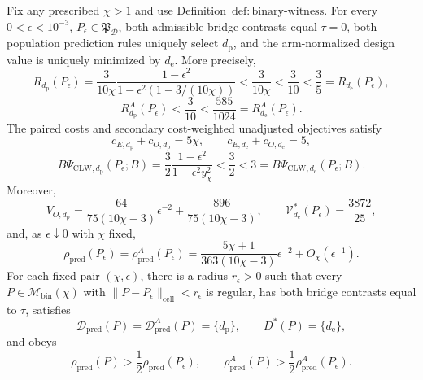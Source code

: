 Fix any prescribed \(\chi>1\) and use Definition~\(\mathrm{def{:}binary\text{-}witness}\).  For every \(0<\epsilon<10^{-3}\), \(P_\epsilon\in\mathfrak P_{\mathcal D}\), both admissible bridge contrasts equal \(\tau=0\), both population prediction rules uniquely select \(d_{\mathrm p}\), and the arm-normalized design value is uniquely minimized by \(d_{\mathrm e}\).  More precisely,
\[
 R_{d_{\mathrm p}}(P_\epsilon)
 =\frac{3}{10\chi}\frac{1-\epsilon^2}{1-\epsilon^2(1-3/(10\chi))}
 <\frac{3}{10\chi}<\frac3{10}<\frac35=R_{d_{\mathrm e}}(P_\epsilon),
\]
\[
 R_{d_{\mathrm p}}^A(P_\epsilon)<\frac3{10}
 <\frac{585}{1024}=R_{d_{\mathrm e}}^A(P_\epsilon).
\]
The paired costs and secondary cost-weighted unadjusted objectives satisfy
\[
 c_{E,d_{\mathrm p}}+c_{O,d_{\mathrm p}}=5\chi,
 \qquad c_{E,d_{\mathrm e}}+c_{O,d_{\mathrm e}}=5,
\]
\[
 B\Psi_{\mathrm{CLW},d_{\mathrm p}}(P_\epsilon;B)
 =\frac32\frac{1-\epsilon^2}{1-\epsilon^2y_\chi^2}
 <\frac32<3=B\Psi_{\mathrm{CLW},d_{\mathrm e}}(P_\epsilon;B).
\]
Moreover,
\[
 V_{O,d_{\mathrm p}}
 =\frac{64}{75(10\chi-3)}\epsilon^{-2}
 +\frac{896}{75(10\chi-3)},
 \qquad \mathcal V_{d_{\mathrm e}}^*(P_\epsilon)=\frac{3872}{25},
\]
and, as \(\epsilon\downarrow0\) with \(\chi\) fixed,
\[
 \rho_{\mathrm{pred}}(P_\epsilon)
 =\rho_{\mathrm{pred}}^A(P_\epsilon)
 =\frac{5\chi+1}{363(10\chi-3)}\epsilon^{-2}+O_\chi(\epsilon^{-1}).
\]
For each fixed pair \((\chi,\epsilon)\), there is a radius \(r_\epsilon>0\) such that every \(P\in\mathcal M_{\mathrm{bin}}(\chi)\) with \(\|P-P_\epsilon\|_{\mathrm{cell}}<r_\epsilon\) is regular, has both bridge contrasts equal to \(\tau\), satisfies
\[
 \mathcal D_{\mathrm{pred}}(P)=\mathcal D_{\mathrm{pred}}^A(P)=\{d_{\mathrm p}\},
 \qquad D^*(P)=\{d_{\mathrm e}\},
\]
and obeys
\[
 \rho_{\mathrm{pred}}(P)>\frac12\rho_{\mathrm{pred}}(P_\epsilon),
 \qquad
 \rho_{\mathrm{pred}}^A(P)>\frac12\rho_{\mathrm{pred}}^A(P_\epsilon).
\]